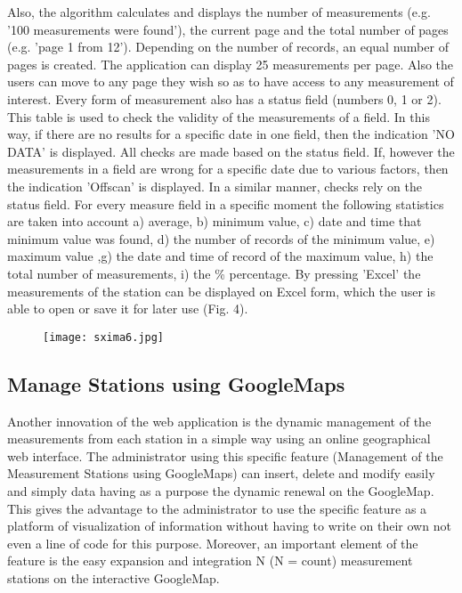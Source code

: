 \documentclass[conference]{IEEEtran}
\begin{document}
Also, the algorithm calculates and displays the number of measurements (e.g. '100 measurements were found'), the current page and the total number of pages (e.g. 'page 1 from 12'). Depending on the number of records, an equal number of pages is created. The application can display 25 measurements per page. Also the users can move to any page they wish so as to have access to any measurement of interest.  Every form of measurement also has a status field (numbers 0, 1 or 2). This table is used to check the validity of the measurements of a field. In this way, if there are no results for a specific date in one field, then the indication 'NO DATA' is displayed. All checks are made based on the status field. If,  however  the measurements in a field are wrong for a specific date  due to various factors, then the indication 'Offscan' is displayed. In a similar manner, checks rely on the status field. For every measure field in a specific moment the following statistics are taken into account a) average, b) minimum value, c) date and time that minimum value was found, d) the number of records of the minimum value, e) maximum value ,g) the date and  time of record of the maximum value, h) the total number of measurements, i) the \% percentage. By pressing 'Excel' the measurements of the station can be displayed on Excel form, which the user is able to open or save it  for later use (Fig. 4). 

\begin{figure}[!h]
	\centering
	\texttt{[image: sxima6.jpg]}
 
\caption{}
\end{figure}

 \subsection{Manage Stations using GoogleMaps}

Another innovation of the web application is the dynamic management of the measurements from each station in a simple way using an online geographical web interface. The administrator using this specific feature (Management of the Measurement Stations using GoogleMaps) can insert, delete and modify easily and simply data having as a purpose the dynamic renewal on the GoogleMap. This gives the advantage to the administrator to use the specific feature as a platform of visualization of information without having to write on their own not even a line of code for this purpose. Moreover, an important element of the feature is the easy expansion and integration N (N = count) measurement stations on the interactive GoogleMap.
\end{document}
